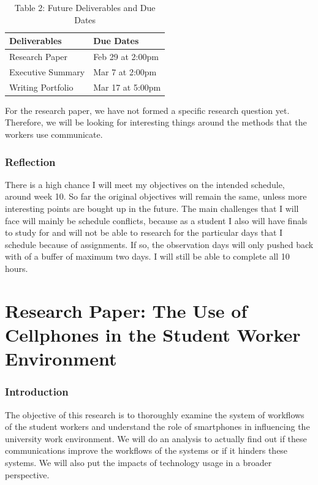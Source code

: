 \documentclass[letterpaper, 12pt]{report}
\begin{document}
	\begin{table}[ht]
		\centering
		\caption*{Table 2: Future Deliverables and Due Dates}
		\begin{tabular}{l l}
			\hline \hline
			Deliverables&Due Dates\\
			\hline
			Research Paper&Feb 29 at 2:00pm\\
			Executive Summary& Mar 7 at 2:00pm\\
			Writing Portfolio& Mar 17 at 5:00pm\\
			\hline
		\end{tabular}
	\end{table}
	
	For the research paper, we have not formed a specific research question yet. Therefore, we will be looking for interesting things around the methods that the workers use communicate.
	
	\section{Reflection}
	There is a high chance I will meet my objectives on the intended schedule, around week 10. So far the original objectives will remain the same, unless more interesting points are bought up in the future. The main challenges that I will face will mainly be schedule conflicts, because as a student I also will have finals to study for and will not be able to research for the particular days that I schedule because of assignments. If so, the observation days will only pushed back with of a buffer of maximum two days. I will still be able to complete all 10 hours.


\part{Research Paper: The Use of Cellphones in the Student Worker Environment}


	
	\section{Introduction}
	
	The objective of this research is to thoroughly examine the system of workflows of the student workers and understand the role of smartphones in influencing the university work environment. We will do an analysis to actually find out if these communications improve the workflows of the systems or if it hinders these systems. We will also put the impacts of technology usage in a broader perspective.\\
		
\end{document}
